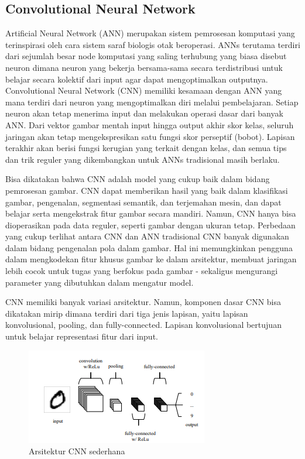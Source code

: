 \subsection{Convolutional Neural Network}
Artificial Neural Network (ANN) merupakan sistem pemrosesan komputasi yang terinspirasi oleh cara sistem saraf biologis otak beroperasi. ANNs terutama terdiri dari sejumlah besar node komputasi yang saling terhubung yang biasa disebut neuron dimana neuron yang bekerja bersama-sama secara terdistribusi untuk belajar secara kolektif dari input agar dapat mengoptimalkan outputnya. Convolutional Neural Network (CNN) memiliki kesamaan dengan ANN yang mana terdiri dari neuron yang mengoptimalkan diri melalui pembelajaran. Setiap neuron akan tetap menerima input dan melakukan operasi dasar dari banyak ANN. Dari vektor gambar mentah input hingga output akhir skor kelas, seluruh jaringan akan tetap mengekspresikan satu fungsi skor perseptif (bobot). Lapisan terakhir akan berisi fungsi kerugian yang terkait dengan kelas, dan semua tips dan trik reguler yang dikembangkan untuk ANNs tradisional masih berlaku\parencite{Keiron2015}.

Bisa dikatakan bahwa CNN adalah model yang cukup baik dalam bidang pemrosesan gambar. CNN dapat memberikan hasil yang baik dalam klasifikasi gambar, pengenalan, segmentasi semantik, dan terjemahan mesin, dan dapat belajar serta mengekstrak fitur gambar secara mandiri. Namun, CNN hanya bisa dioperasikan pada data reguler, seperti gambar dengan ukuran tetap\parencite{Ruyue2020}. Perbedaan yang cukup terlihat antara CNN dan ANN tradisional CNN banyak digunakan dalam bidang pengenalan pola dalam gambar. Hal ini memungkinkan pengguna dalam mengkodekan fitur khusus gambar ke dalam arsitektur, membuat jaringan lebih cocok untuk tugas yang berfokus pada gambar - sekaligus mengurangi parameter yang dibutuhkan dalam mengatur model\parencite{Keiron2015}.

CNN memiliki banyak variasi arsitektur. Namun, komponen dasar CNN bisa dikatakan mirip dimana terdiri dari tiga jenis lapisan, yaitu lapisan konvolusional, pooling, dan fully-connected. Lapisan konvolusional bertujuan untuk belajar representasi fitur dari input\parencite{Jiuxiang2018}.

\begin{figure} [H] \centering
  \includegraphics[scale=1]{gambar/bab2/cnn1.png}
  \caption{Arsitektur CNN sederhana \parencite{Keiron2015}}
  \label{fig:CNNArsi}
\end{figure}

